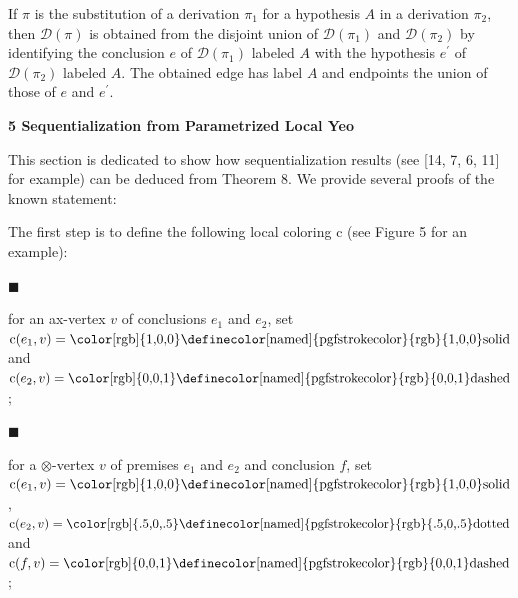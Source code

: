 \documentclass[10pt,a4paper]{amsart}
\begin{document}
 
If $\pi$ is the substitution of a derivation $\pi_{1}$ for a hypothesis $A$ in a derivation $\pi_{2}$, then $\mathcal{D}(\pi)$ is obtained from the disjoint union of $\mathcal{D}(\pi_{1})$ and $\mathcal{D}(\pi_{2})$ by identifying the conclusion $e$ of $\mathcal{D}(\pi_{1})$ labeled $A$ with the hypothesis $e^{\prime}$ of $\mathcal{D}(\pi_{2})$ labeled $A$. The obtained edge has label $A$ and endpoints the union of those of $e$ and $e^{\prime}$.\par
 
 
 
 


 
\par\medskip\noindent\textbf{5 Sequentialization from Parametrized Local Yeo}\par
 
 
This section is dedicated to show how sequentialization results (see [14, 7, 6, 11] for example) can be deduced from Theorem 8. We provide several proofs of the known statement:\par
 

 
The first step is to define the following local coloring c (see Figure 5 for an example):\par
  
\par\noindent  $\blacksquare$ 
 
for an ax-vertex $v$ of conclusions $e_{1}$ and $e_{2}$, set $\textnormal{{c}}(e_{1},v)=\text{{\color[rgb]{1,0,0}\definecolor[named]{%
pgfstrokecolor}{rgb}{1,0,0}solid}}$ and $\textnormal{{c}}(e_{2},v)=\text{{\color[rgb]{0,0,1}\definecolor[named]{%
pgfstrokecolor}{rgb}{0,0,1}dashed}}$;\par
 
 
 
\par\noindent  $\blacksquare$ 
 
for a $\otimes$-vertex $v$ of premises $e_{1}$ and $e_{2}$ and conclusion $f$, set $\textnormal{{c}}(e_{1},v)=\text{{\color[rgb]{1,0,0}\definecolor[named]{%
pgfstrokecolor}{rgb}{1,0,0}solid}}$, $\textnormal{{c}}(e_{2},v)=\text{{\color[rgb]{.5,0,.5}\definecolor[named]{%
pgfstrokecolor}{rgb}{.5,0,.5}dotted}}$ and $\textnormal{{c}}(f,v)=\text{{\color[rgb]{0,0,1}\definecolor[named]{%
pgfstrokecolor}{rgb}{0,0,1}dashed}}$;\par
 
\end{document}
